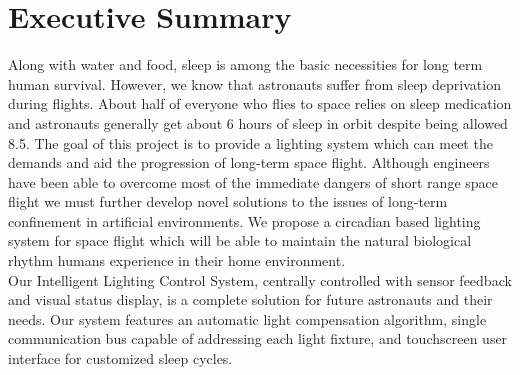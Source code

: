 \documentclass[12pt,a4paper]{report}
\begin{document}
\section*{Executive Summary}
Along with water and food, sleep is among the basic necessities for long term human survival. However, we know that astronauts suffer from sleep deprivation during flights. About half of everyone who flies to space relies on sleep medication and astronauts generally get about 6 hours of sleep in orbit despite being allowed 8.5.\cite{spacesleep} The goal of this project is to provide a lighting system which can meet the demands and aid the progression of long-term space flight. Although engineers have been able to overcome most of the immediate dangers of short range space flight we must further develop novel solutions to the issues of long-term confinement in artificial environments. We propose a circadian based lighting system for space flight which will be able to maintain the natural biological rhythm humans experience in their home environment.  \\ \linebreak 
Our Intelligent Lighting Control System, centrally controlled with sensor feedback and visual status display, is a complete solution for future astronauts and their needs. Our system features an automatic light compensation algorithm, single communication bus capable of addressing each light fixture, and touchscreen user interface for customized sleep cycles. 
\newpage
\renewcommand{\thepage}{\roman{page}}
\tableofcontents
\listoffigures
\listoftables
\newpage
\renewcommand{\thepage}{\arabic{page}}
\setcounter{page}{1}
\end{document}
